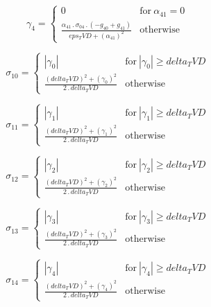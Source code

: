 \documentclass{article}
\begin{document}
\begin{dmath}\gamma_{4} = \begin{cases} 0 & \text{for}\: \alpha_{41} = 0 \\\frac{\alpha_{41} \,.\, \sigma_{0 4} \,.\, \left(- g_{40} + g_{41}\right)}{eps_TVD + \left(\alpha_{41} \right)^{2}} & \text{otherwise} \end{cases}\end{dmath}

\begin{dmath}\sigma_{1 0} = \begin{cases} \left|{\gamma_{0}}\right| & \text{for}\: \left|{\gamma_{0}}\right| \geq delta_TVD \\\frac{\left(delta_TVD \right)^{2} + \left(\gamma_{0} \right)^{2}}{2 \,.\, delta_TVD} & \text{otherwise} 
\end{cases}\end{dmath}

\begin{dmath}\sigma_{1 1} = \begin{cases} \left|{\gamma_{1}}\right| & \text{for}\: \left|{\gamma_{1}}\right| \geq delta_TVD \\\frac{\left(delta_TVD \right)^{2} + \left(\gamma_{1} \right)^{2}}{2 \,.\, delta_TVD} & \text{otherwise} 
\end{cases}\end{dmath}

\begin{dmath}\sigma_{1 2} = \begin{cases} \left|{\gamma_{2}}\right| & \text{for}\: \left|{\gamma_{2}}\right| \geq delta_TVD \\\frac{\left(delta_TVD \right)^{2} + \left(\gamma_{2} \right)^{2}}{2 \,.\, delta_TVD} & \text{otherwise} 
\end{cases}\end{dmath}

\begin{dmath}\sigma_{1 3} = \begin{cases} \left|{\gamma_{3}}\right| & \text{for}\: \left|{\gamma_{3}}\right| \geq delta_TVD \\\frac{\left(delta_TVD \right)^{2} + \left(\gamma_{3} \right)^{2}}{2 \,.\, delta_TVD} & \text{otherwise} 
\end{cases}\end{dmath}

\begin{dmath}\sigma_{1 4} = \begin{cases} \left|{\gamma_{4}}\right| & \text{for}\: \left|{\gamma_{4}}\right| \geq delta_TVD \\\frac{\left(delta_TVD \right)^{2} + \left(\gamma_{4} \right)^{2}}{2 \,.\, delta_TVD} & \text{otherwise} 
\end{cases}\end{dmath}
\end{document}
